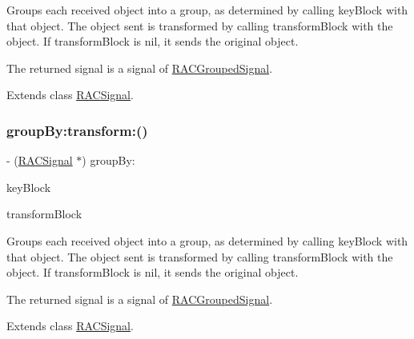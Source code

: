 Groups each received object into a group, as determined by calling {\ttfamily key\+Block} with that object. The object sent is transformed by calling {\ttfamily transform\+Block} with the object. If {\ttfamily transform\+Block} is nil, it sends the original object.

The returned signal is a signal of \mbox{\hyperlink{interface_r_a_c_grouped_signal}{R\+A\+C\+Grouped\+Signal}}. 

Extends class \mbox{\hyperlink{interface_r_a_c_signal_ad04cf174e24905df96f211b60e31a3cd}{R\+A\+C\+Signal}}.

\mbox{\label{category_r_a_c_signal_07_operations_08_ad04cf174e24905df96f211b60e31a3cd}} 
\subsubsection{\texorpdfstring{group\+By\+:transform\+:()}{groupBy:transform:()}\hspace{0.1cm}{\footnotesize\ttfamily [3/3]}}
{\footnotesize\ttfamily -\/ (\mbox{\hyperlink{interface_r_a_c_signal}{R\+A\+C\+Signal}} $\ast$) group\+By\+: \begin{DoxyParamCaption}\item[{(id$<$ N\+S\+Copying $>$($^\wedge$)(id object))}]{key\+Block }\item[{transform:(id($^\wedge$)(id object))}]{transform\+Block }\end{DoxyParamCaption}}

Groups each received object into a group, as determined by calling {\ttfamily key\+Block} with that object. The object sent is transformed by calling {\ttfamily transform\+Block} with the object. If {\ttfamily transform\+Block} is nil, it sends the original object.

The returned signal is a signal of \mbox{\hyperlink{interface_r_a_c_grouped_signal}{R\+A\+C\+Grouped\+Signal}}. 

Extends class \mbox{\hyperlink{interface_r_a_c_signal_ad04cf174e24905df96f211b60e31a3cd}{R\+A\+C\+Signal}}.

\mbox{\label{category_r_a_c_signal_07_operations_08_a67c14dfcf505999bc53632e336f6cb84}} 
